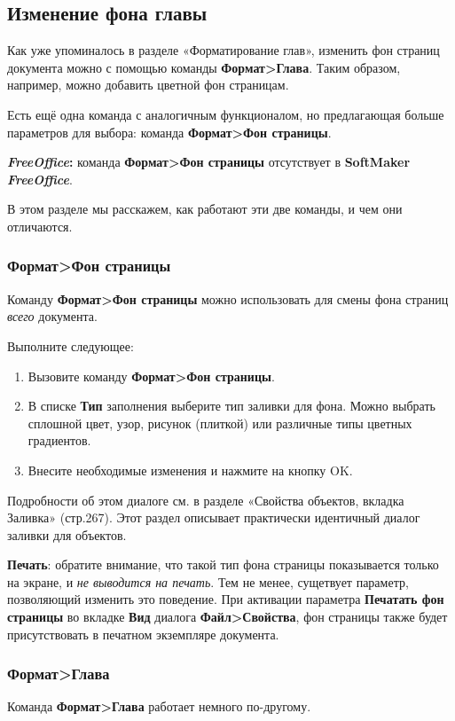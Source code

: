 \documentclass[a4paper,10pt]{article}
\begin{document}
\subsection{Изменение фона главы}
Как уже упоминалось в разделе «Форматирование глав», изменить фон страниц документа можно с помощью команды \textbf{Формат>Глава}. Таким образом, например, можно добавить цветной фон страницам.

Есть ещё одна команда с аналогичным функционалом, но предлагающая больше параметров для выбора: команда \textbf{Формат>Фон страницы}.
\begin{mdframed}[backgroundcolor=pink!50]
\textbf{\textit{FreeOffice}:} команда \textbf{Формат>Фон страницы} отсутствует в \textbf{SoftMaker} \textbf{\textit{FreeOffice}}.
\end{mdframed}

В этом разделе мы расскажем, как работают эти две команды, и чем они отличаются.

\subsubsection{\textbf{Формат>Фон страницы}}
Команду \textbf{Формат>Фон страницы} можно использовать для смены фона страниц \textit{всего} документа.

Выполните следующее:
\begin{enumerate}
 \item Вызовите команду \textbf{Формат>Фон страницы}.
 \item В списке \textbf{Тип} заполнения выберите тип заливки для фона. Можно выбрать сплошной цвет, узор, рисунок (плиткой) или различные типы цветных градиентов.
 \item Внесите необходимые изменения и нажмите на кнопку OK.
\end{enumerate}

Подробности об этом диалоге см. в разделе «Свойства объектов, вкладка Заливка» (стр.267). Этот раздел описывает практически идентичный диалог заливки для объектов.

\textbf{Печать}: обратите внимание, что такой тип фона страницы показывается только на экране, и \textit{не выводится на печать}. Тем не менее, сущетвует параметр, позволяющий изменить это поведение. При активации параметра \textbf{Печатать фон страницы} во вкладке \textbf{Вид} диалога \textbf{Файл>Свойства}, фон страницы также будет присутствовать в печатном экземпляре документа.

\subsubsection{\textbf{Формат>Глава}}
Команда \textbf{Формат>Глава} работает немного по-другому.
\end{document}
